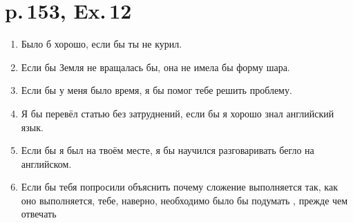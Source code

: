 \documentclass[a4paper,10pt,notitlepage,pdftex,headsepline]{scrartcl}
\begin{document}
\section{p.\,153, Ex.\,12}
\begin{enumerate}
\item Было б хорошо, если бы ты не курил.
\item Если бы Земля не вращалась бы, она не имела бы форму шара.
\item Если бы у меня было время, я бы помог тебе решить проблему.
\item Я бы перевёл статью без затруднений, если бы я хорошо знал английский язык.
\item Если бы я был на твоём месте, я бы научился разговаривать бегло на английском.
\item Если бы тебя попросили объяснить почему сложение выполняется так, как оно выполняется, тебе, наверно, необходимо было бы подумать , прежде чем отвечать
\end{enumerate}
\end{document}
